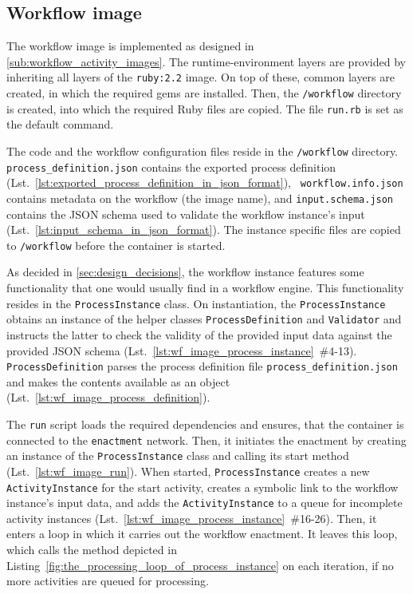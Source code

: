   \subsection{Workflow image} %
  \label{sub:workflow_container}
    The workflow image is implemented as designed in \ref{sub:workflow_activity_images}. The runtime-environment layers are provided by inheriting all layers of the \texttt{ruby:2.2} image. On top of these, common layers are created, in which the required gems are installed. Then, the \texttt{/workflow} directory is created, into which the required Ruby files are copied. The file \texttt{run.rb} is set as the default command.

    The code and the workflow configuration files reside in the \texttt{/workflow} directory. \texttt{pro\-cess\_de\-fi\-ni\-tion.json} contains the exported process definition (Lst.~\ref{lst:exported_process_definition_in_json_format}), \texttt{ workflow.info.json} contains metadata on the workflow (\eg the image name), and \texttt{input.schema.json} contains the \ac{JSON} schema used to validate the workflow instance's input (Lst.~\ref{lst:input_schema_in_json_format}). The instance specific files are copied to \texttt{/workflow} before the container is started.

    As decided in \ref{sec:design_decisions}, the workflow instance features some functionality that one would usually find in a workflow engine. This functionality resides in the \texttt{ProcessInstance} class. On instantiation, the \texttt{ProcessInstance} obtains an instance of the helper classes \texttt{ProcessDefinition} and \texttt{Validator} and instructs the latter to check the validity of the provided input data against the provided \ac{JSON} schema (Lst.~\ref{lst:wf_image_process_instance}~\#4-13). \texttt{ProcessDefinition} parses the process definition file \texttt{process\_definition.json} and makes the contents available as an object (Lst.~\ref{lst:wf_image_process_definition}).

    The \texttt{run} script loads the required dependencies and ensures, that the container is connected to the \texttt{enactment} network. Then, it initiates the enactment by creating an instance of the \texttt{ProcessInstance} class and calling its start method (Lst.~\ref{lst:wf_image_run}).
    When started, \texttt{ProcessInstance} creates a new \texttt{ActivityInstance} for the start activity, creates a symbolic link to the workflow instance's input data, and adds the \texttt{ActivityInstance} to a queue for incomplete activity instances (Lst.~\ref{lst:wf_image_process_instance}~\#16-26). Then, it enters a loop in which it carries out the workflow enactment. It leaves this loop, which calls the method depicted in Listing~\ref{fig:the_processing_loop_of_process_instance} on each iteration, if no more activities are queued for processing.


